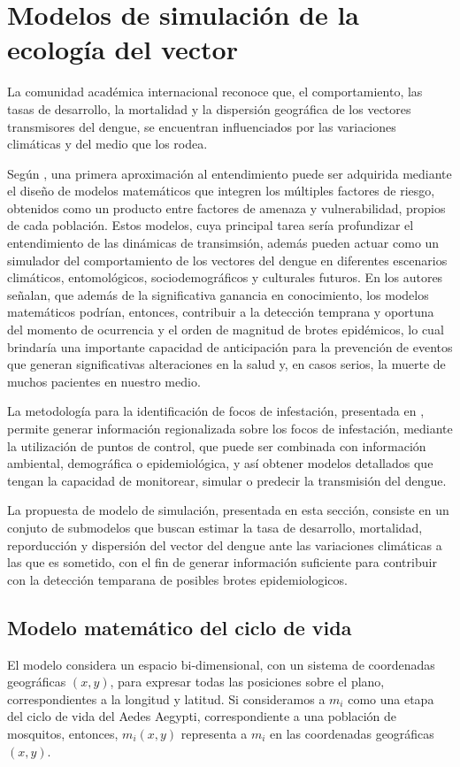 \section{Modelos de simulación de la ecología del vector}
\label{sec:cap4-modelo-simulacion}

La comunidad académica internacional reconoce que, el comportamiento, las tasas de desarrollo, la
mortalidad y la dispersión geográfica de los vectores transmisores del dengue, se encuentran
influenciados por las variaciones climáticas y del medio que los rodea.

Según \cite{velez2013hacia}, una primera aproximación al entendimiento puede ser adquirida
mediante el diseño de modelos matemáticos que integren los múltiples factores de riesgo, obtenidos
como un producto entre factores de amenaza y vulnerabilidad, propios de cada población. Estos
modelos, cuya principal tarea sería profundizar el entendimiento de las dinámicas de transimsión,
además pueden actuar como un simulador del comportamiento de los vectores del dengue en diferentes
escenarios climáticos, entomológicos, sociodemográficos y culturales futuros. En
\cite{velez2013hacia} los autores señalan, que además de la significativa ganancia en
conocimiento, los modelos matemáticos podrían, entonces, contribuir a la detección temprana y
oportuna del momento de ocurrencia y el orden de magnitud de brotes epidémicos, lo cual brindaría
una importante capacidad de anticipación para la prevención de eventos que generan significativas
alteraciones en la salud y, en casos serios, la muerte de muchos pacientes en nuestro medio.

La metodología para la identificación de focos de infestación, presentada en \cite{NINO2011},
permite generar información regionalizada sobre los focos de infestación, mediante la utilización
de puntos de control, que puede ser combinada con información ambiental, demográfica o
epidemiológica, y así obtener modelos detallados que tengan la capacidad de monitorear, simular o
predecir la transmisión del dengue.

La propuesta de modelo de simulación, presentada en esta sección, consiste en un conjuto de
submodelos que buscan estimar la tasa de desarrollo, mortalidad, reporducción y dispersión del
vector del dengue ante las variaciones climáticas a las que es sometido, con el fin de generar
información suficiente para contribuir con la detección temparana de posibles brotes
epidemiologicos.

\subsection{Modelo matemático del ciclo de vida}
\label{subsec:cap4-modelo-matematico-ciclo-vida}
El modelo considera un espacio bi-dimensional, con un sistema de coordenadas geográficas $(x,y)$,
para expresar todas las posiciones sobre el plano, correspondientes a la longitud y latitud. Si
consideramos a $m_{i}$ como una etapa del ciclo de vida del Aedes Aegypti, correspondiente a una
población de mosquitos, entonces, $m_{i}(x,y)$ representa a $m_{i}$ en las coordenadas geográficas
$(x,y)$.

